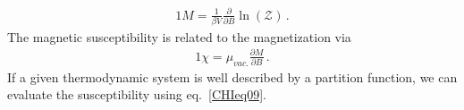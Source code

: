 \documentclass[
aps,
pra,
twocolumn,
showpacs,
preprintnumbers,
amsmath,
amssymb,
footinbib
]{revtex4-2}
\begin{document}
\begin{alignat}{1}
  \label{CHIeq08} M=\frac{1}{\beta V}\frac{\partial}{\partial B}\ln\left(\mathcal{Z}\right)\,.
\end{alignat}
The magnetic susceptibility is related to the magnetization via
\begin{alignat}{1}
  \label{CHIeq09} \chi=\mu_{vac.}\frac{\partial M}{\partial B}\,.
\end{alignat}
If a given thermodynamic system is well described by a partition function, we can evaluate the susceptibility using eq.~\eqref{CHIeq09}.
\end{document}
